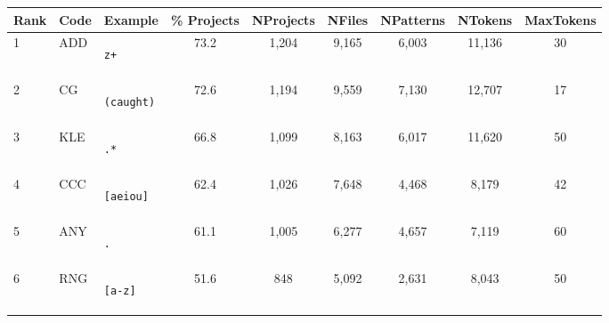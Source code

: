 \begin{table*}
\begin{center}
\begin{footnotesize}
\caption{Frequency of feature appearance in Projects, Files and Patterns, with number of tokens observed and the maximum number of tokens observed in a single pattern.}
\label{table:featureStatsOnly}
\begin{tabular}
{lllcccc  cc}
\textbf{Rank} & \textbf{Code} & \textbf{Example} & \% \textbf{Projects} & \textbf{NProjects} & \textbf{NFiles} & \textbf{NPatterns} & \textbf{NTokens} & \textbf{MaxTokens} \\
\toprule[0.16em]
1 & ADD & \begin{minipage}{0.5in}\begin{verbatim}z+\end{verbatim}\end{minipage} & 73.2 & 1,204 & 9,165 & 6,003 & 11,136 & 30 \\
\midrule
2 & CG & \begin{minipage}{0.5in}\begin{verbatim}(caught)\end{verbatim}\end{minipage} & 72.6 & 1,194 & 9,559 & 7,130 & 12,707 & 17 \\
\midrule
3 & KLE & \begin{minipage}{0.5in}\begin{verbatim}.*\end{verbatim}\end{minipage} & 66.8 & 1,099 & 8,163 & 6,017 & 11,620 & 50 \\
\midrule
4 & CCC & \begin{minipage}{0.5in}\begin{verbatim}[aeiou]\end{verbatim}\end{minipage} & 62.4 & 1,026 & 7,648 & 4,468 & 8,179 & 42 \\
\midrule
5 & ANY & \begin{minipage}{0.5in}\begin{verbatim}.\end{verbatim}\end{minipage} & 61.1 & 1,005 & 6,277 & 4,657 & 7,119 & 60 \\
\midrule
6 & RNG & \begin{minipage}{0.5in}\begin{verbatim}[a-z]\end{verbatim}\end{minipage} & 51.6 & 848 & 5,092 & 2,631 & 8,043 & 50 \\

\end{tabular}
\end{footnotesize}
\end{center}
\end{table*}
